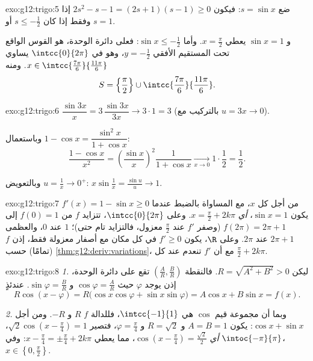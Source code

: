 \begin{solution}{exo:g12:trigo:5}
ضع $s = \sin x$: فيكون $2s^2 - s - 1 = (2s + 1)(s - 1) \geq 0$ إذا وفقط إذا كان
$s \leq -\frac12$ أو $s = 1$.

و $\sin x = 1$ يعطي $x = \frac\pi2$. وأما $\sin x \leq -\frac12$: فعلى دائرة
الوحدة، هو القوس الواقع تحت المستقيم الأفقي $y = -\frac12$، وهو في
$\intcc{0}{2\pi}$ يساوي $x \in \intcc{\frac{7\pi}{6}}{\frac{11\pi}{6}}$.
ومنه
\[
S = \left\{\frac{\pi}{2}\right\} \cup
\intcc{\frac{7\pi}{6}}{\frac{11\pi}{6}} .
\]
\end{solution}

\begin{solution}{exo:g12:trigo:6}
$\dfrac{\sin 3x}{x} = 3\,\dfrac{\sin 3x}{3x} \to 3 \cdot 1 = 3$
(بالتركيب مع $u = 3x \to 0$).

وباستعمال $1 - \cos x = \dfrac{\sin^2 x}{1 + \cos x}$:
\[
\frac{1 - \cos x}{x^2}
= \left(\frac{\sin x}{x}\right)^{\!2} \frac{1}{1 + \cos x}
\xrightarrow[x\to0]{} 1 \cdot \frac12 = \frac12 .
\]

وبالتعويض $u = \frac1x \to 0^+$:
$x \sin\frac1x = \frac{\sin u}{u} \to 1$.
\end{solution}

\begin{solution}{exo:g12:trigo:7}
$f'(x) = 1 - \sin x \geq 0$ من أجل كل $x$، مع المساواة بالضبط عندما يكون
$\sin x = 1$، \emph{أي} $x = \frac\pi2 + 2k\pi$. وعلى $\intcc{0}{2\pi}$، تتزايد $f$
من $f(0) = 1$ إلى $f(2\pi) = 2\pi + 1$ (وصفر $f'$ عند
$\frac{\pi}{2}$ معزول، فالتزايد تام حتى)؛  $1$ عند
$0$، والعظمى $2\pi + 1$ عند $2\pi$. وعلى $\R$، يكون $f' \geq 0$ في كل مكان مع أصفار
معزولة فقط، إذن $f$  (تمامًا) حسب
\cref{thm:g12:deriv:variations}، مع أن $f'$ تنعدم عند كل
$\frac\pi2 + 2k\pi$.
\end{solution}

\begin{solution}{exo:g12:trigo:8}
\emph{1.} ليكن $R = \sqrt{A^2 + B^2} > 0$. فالنقطة
$\left(\frac AR, \frac BR\right)$ تقع على دائرة الوحدة، إذن يوجد
$\varphi$ حيث $\cos\varphi = \frac AR$ و $\sin\varphi = \frac BR$. عندئذٍ
\[
R\cos(x - \varphi) = R\bigl(\cos x\cos\varphi + \sin x \sin\varphi\bigr)
= A\cos x + B\sin x = f(x).
\]

\emph{2.} وبما أن مجموعة قيم $\cos$ هي $\intcc{-1}{1}$، فللدالة $f$  $R$ و
 $-R$. ومن أجل $\cos x + \sin x$: يكون $A = B = 1$ و $R = \sqrt2$ و
$\varphi = \frac\pi4$، فتصير 
$\sqrt2\cos\left(x - \frac\pi4\right) = 1$، \emph{أي}
$\cos\left(x - \frac\pi4\right) = \frac{\sqrt2}{2}$، مما يعطي
$x - \frac\pi4 = \pm\frac\pi4 + 2k\pi$: وفي $\intoc{-\pi}{\pi}$،
$x \in \left\{0, \frac\pi2\right\}$.
\end{solution}

